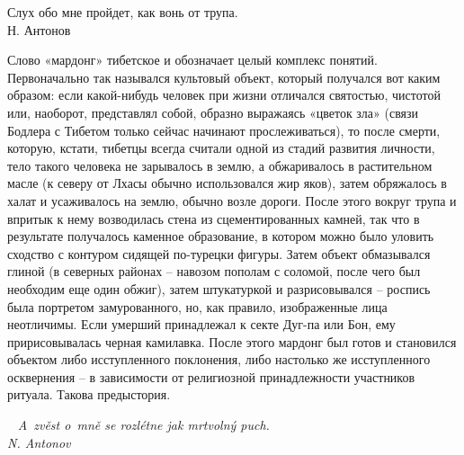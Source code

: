 \begin{pairs}
\begin{Leftside}
\beginnumbering
{\rusky
\pstart
{}
\noindent
Слух обо мне пройдет, как вонь от трупа.\\
Н. Антонов
\pend

\pstart
\noindent
Слово «мардонг» тибетское и обозначает целый комплекс понятий. Первоначально так назывался культовый объект, который получался вот каким образом: если какой-нибудь человек при жизни отличался святостью, чистотой или, наоборот, представлял собой, образно выражаясь «цветок зла» (связи Бодлера с Тибетом только сейчас начинают прослеживаться), то после смер\-ти, которую, кстати, тибетцы всегда считали одной из стадий развития личности, тело такого человека не зарывалось в зем\-лю, а обжаривалось в растительном масле (к северу от Лхасы обычно использовался жир яков), затем обряжалось в халат и усаживалось на землю, обычно возле дороги. После этого вокруг трупа и впритык к нему возводилась стена из сцементированных камней, так что в результате получалось каменное образование, в котором можно было уловить сходство с контуром сидящей по-турецки фигуры. Затем объект обмазывался глиной (в северных районах -- навозом пополам с соломой, после чего был необходим еще один обжиг), затем штукатуркой и разрисовывался -- роспись была портретом замурованного, но, как \linebreak правило, изображенные лица неотличимы. Если умерший принадлежал к секте Дуг-па или Бон, ему пририсовывалась черная камилавка. После этого мардонг был готов и становился объектом либо исступленного поклонения, либо настолько же исступленного осквернения -- в зависимости от религиозной принадлежности участников ритуала. Такова предыстория.
\pend}
\endnumbering
\end{Leftside}

\begin{Rightside}
\beginnumbering
{}
\pstart
~
\noindent
\textit{A~zvěst o~mně se rozlétne jak mrtvolný puch.\\
N. Antonov}
\pend


\end{Rightside}
\end{pairs}
